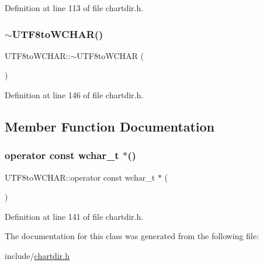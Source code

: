 Definition at line 113 of file chartdir.\+h.

\mbox{\label{class_u_t_f8to_w_c_h_a_r_a49a1f399ddfb0eb2af1de3af6869ba38}} 
\subsubsection{\texorpdfstring{$\sim$\+U\+T\+F8to\+W\+C\+H\+A\+R()}{~UTF8toWCHAR()}}
{\footnotesize\ttfamily U\+T\+F8to\+W\+C\+H\+A\+R\+::$\sim$\+U\+T\+F8to\+W\+C\+H\+AR (\begin{DoxyParamCaption}{ }\end{DoxyParamCaption})\hspace{0.3cm}{\ttfamily [inline]}}



Definition at line 146 of file chartdir.\+h.



\subsection{Member Function Documentation}
\mbox{\label{class_u_t_f8to_w_c_h_a_r_a86cb80aac913631448116464a704718a}} 
\subsubsection{\texorpdfstring{operator const wchar\+\_\+t $\ast$()}{operator const wchar\_t *()}}
{\footnotesize\ttfamily U\+T\+F8to\+W\+C\+H\+A\+R\+::operator const wchar\+\_\+t $\ast$ (\begin{DoxyParamCaption}{ }\end{DoxyParamCaption})\hspace{0.3cm}{\ttfamily [inline]}}



Definition at line 141 of file chartdir.\+h.



The documentation for this class was generated from the following file\+:\begin{DoxyCompactItemize}
\item 
include/\hyperlink{chartdir_8h}{chartdir.\+h}\end{DoxyCompactItemize}
